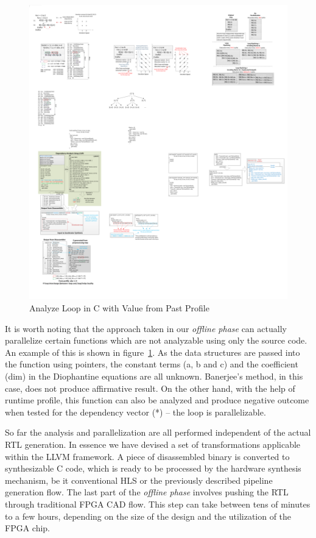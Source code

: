 \begin{figure}[htp]
\begin{center}
\includegraphics[width=0.85\linewidth]{chap6fig/sourceCodeAnalysis.pdf}
\caption{Analyze Loop in C with Value from Past Profile 
\label{fig:srcAna}}
\end{center}
\end{figure}

It is worth noting that the approach taken in our \textit{offline phase} can actually parallelize certain functions which are not analyzable using only the source code. An example of this is shown in figure~\ref{fig:srcAna}. As the data structures
are passed into the function using pointers, the constant terms (a, b and c) and the coefficient (dim) in the Diophantine equations are all unknown. Banerjee's method, in this case, does not produce affirmative result. On the other hand, with the help of runtime profile,  this function can also be analyzed and produce negative
outcome when tested for the dependency vector (*) -- the loop is parallelizable. 

So far the analysis and parallelization are all performed independent of the actual
RTL generation. In essence we have devised a set of transformations applicable within the LLVM framework. A piece of disassembled binary is converted to synthesizable C code, which is ready to be processed by the hardware synthesis mechanism, be it conventional HLS or the previously described pipeline generation flow. The last part of the \textit{offline phase} involves pushing the RTL through traditional FPGA CAD flow. This step can take between tens of minutes to a few hours,
depending on the size of the design and the utilization of the FPGA chip. 



